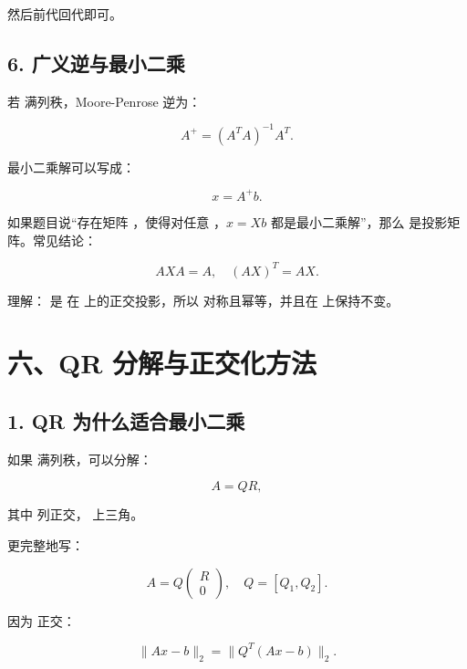 \documentclass[11pt,a4paper]{ctexart}
\newcommand{\code}[1]{\begingroup\ttfamily\small #1\endgroup}
\begin{document}
然后前代回代即可。


\subsection*{6. 广义逆与最小二乘}


若 \code{} 满列秩，Moore-Penrose 逆为：

\[
A^+=(A^TA)^{-1}A^T.
\]

最小二乘解可以写成：

\[
x=A^+b.
\]

如果题目说“存在矩阵 \code{}，使得对任意 \code{}，$x=Xb$ 都是最小二乘解”，那么 \code{} 是投影矩阵。常见结论：

\[
AXA=A,\quad (AX)^T=AX.
\]

理解：\code{} 是 \code{} 在 \code{} 上的正交投影，所以 \code{} 对称且幂等，并且在 \code{} 上保持不变。


\section*{六、QR 分解与正交化方法}



\subsection*{1. QR 为什么适合最小二乘}


如果 \code{} 满列秩，可以分解：

\[
A=QR,
\]

其中 \code{} 列正交，\code{} 上三角。

更完整地写：

\[
A=Q\begin{pmatrix}R\\0\end{pmatrix},\quad Q=[Q_1,Q_2].
\]

因为 \code{} 正交：

\[
\|Ax-b\|_2=\|Q^T(Ax-b)\|_2.
\]
\end{document}
